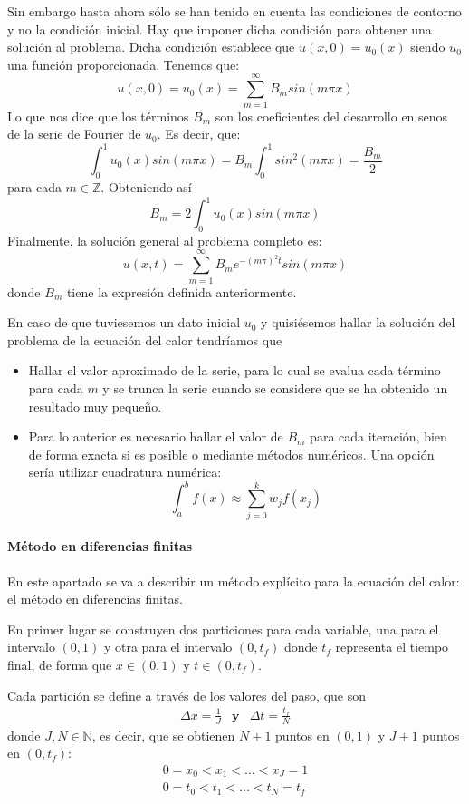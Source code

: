 Sin embargo hasta ahora sólo se han tenido en cuenta las condiciones de contorno y no la condición inicial. Hay que imponer dicha condición para obtener una solución al problema. Dicha condición establece que $u(x,0) = u_0(x)$ siendo $u_0$ una función proporcionada.
Tenemos que:
$$u(x,0) = u_0(x) = \sum_{m=1}^\infty B_m sin(m\pi x)$$
Lo que nos dice que los términos $B_m$ son los coeficientes del desarrollo en senos de la serie de Fourier de $u_0$.
Es decir, que:
$$\int_0^1 u_0(x) sin(m\pi x) = B_m \int_0^1 sin^2(m\pi x) = \frac{B_m}{2}$$ para cada $m\in\mathbb{Z}$. Obteniendo así $$B_m = 2\int_0^1 u_0(x) sin(m\pi x)$$
Finalmente, la solución general al problema completo es:
$$u(x,t) = \sum_{m=1}^\infty B_m e^{-(m\pi)^2 t} sin(m\pi x)$$ donde $B_m$ tiene la expresión definida anteriormente.

En caso de que tuviesemos un dato inicial $u_0$ y quisiésemos hallar la solución del problema de la ecuación del calor tendríamos que

\begin{itemize}
	\item Hallar el valor aproximado de la serie, para lo cual se evalua cada término para cada $m$ y se trunca la serie cuando se considere que se ha obtenido un resultado muy pequeño.
	\item Para lo anterior es necesario hallar el valor de $B_m$ para cada iteración, bien de forma exacta si es posible o mediante métodos numéricos. Una opción sería utilizar cuadratura numérica:
	$$\int_a^b f(x) \approx \sum_{j=0}^k w_j f(x_j)$$
\end{itemize}

\paragraph{Método en diferencias finitas}
En este apartado se va a describir un método explícito para la ecuación del calor: el método en diferencias finitas.

En primer lugar se construyen dos particiones para cada variable, una para el intervalo $(0,1)$ y otra para el intervalo $(0,t_f)$ donde $t_f$ representa el tiempo final, de forma que $x\in(0,1)$ y $t\in(0,t_f)$.

Cada partición se define a través de los valores del paso, que son
\begin{equation*}
	\begin{array}{lll}
		\Delta x = \frac{1}{J}& \textbf{y} & \Delta t = \frac{t_f}{N}
	\end{array}
\end{equation*}
donde $J,N\in\mathbb{N}$, es decir, que se obtienen $N+1$ puntos en $(0,1)$ y $J+1$ puntos en $(0,t_f)$:
\begin{align*}
0=x_0<x_1<\hdots<x_J = 1\\
0=t_0<t_1<\hdots<t_N = t_f
\end{align*}

